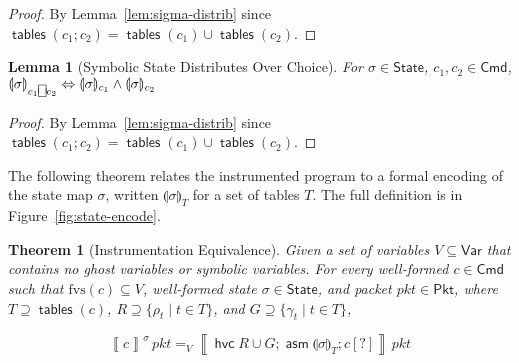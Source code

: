 \documentclass{article}
\newcommand{\pkt}{\mathit{pkt}}
\newcommand{\denote}[1]{\left\llbracket#1\right\rrbracket}
\newcommand{\Cmd}{\mathsf{Cmd}}
\newcommand{\Pkt}{\mathsf{Pkt}}
\newcommand{\Var}{\mathsf{Var}}
\newcommand{\State}{\mathsf{State}}
\newcommand{\assume}{\mathop{\mathsf{asm}}}
\newcommand{\choiceop}{\rotatebox[origin=c]{90}{$\sqsubset\!\!\!\sqsupset$}}
\newcommand{\choice}{\mathbin{\choiceop}}
\newcommand{\havoc}[1]{\mathop{\mathsf{hvc}}#1}
\newcommand{\state}[1]{\llparenthesis#1\rrparenthesis}
\newcommand{\instr}{[?]}
\newcommand{\fvs}{\textrm{fvs}}
\newcommand{\tables}{\mathop{\mathsf{tables}}}
\theoremstyle{plain}
\newtheorem{theorem}{Theorem}
\newtheorem{lemma}{Lemma}
\theoremstyle{definition}
\theoremstyle{remark}
\begin{document}
\begin{proof}
  By Lemma~\ref{lem:sigma-distrib} since $\tables(c_1;c_2) = \tables(c_1) \cup \tables(c_2)$.
\end{proof}

\begin{lemma}[Symbolic State Distributes Over Choice]
  \label{lem:sigma-distrib-choice}
  For $\sigma \in \State$, $c_1,c_2 \in \Cmd$,
  $\state\sigma_{c_1 \choice c_2} \Leftrightarrow \state{\sigma}_{c_1}\wedge\state{\sigma}_{c_2}$
\end{lemma}

\begin{proof}
  By Lemma~\ref{lem:sigma-distrib} since $\tables(c_1;c_2) = \tables(c_1) \cup \tables(c_2)$.
\end{proof}


The following theorem relates the instrumented program to a
formal encoding of the state map $\sigma$, written $\state\sigma_T$ for a set of
tables $T$. The full definition is in Figure~\ref{fig:state-encode}.

\begin{samepage}
\begin{theorem}[Instrumentation Equivalence]
  \label{thm:instr-equiv}
  Given a set of variables $V \subseteq \Var$ that contains no ghost variables
  or symbolic variables. For every well-formed $c \in \Cmd$ such that $\fvs(c) \subseteq V$,
  well-formed state $\sigma \in \State$, and packet $\pkt \in \Pkt$,
  where $T \supseteq \tables(c)$, $R \supseteq \{\rho_t \mid t \in T\}$, and $G \supseteq \{\gamma_t \mid t \in
  T\}$,

  \[\denote{c}^\sigma\,\pkt =_V \denote{\havoc {R \cup G}; \assume{\state\sigma}_T; c\instr}\,\pkt  \]
\end{theorem}
\end{samepage}
\end{document}
